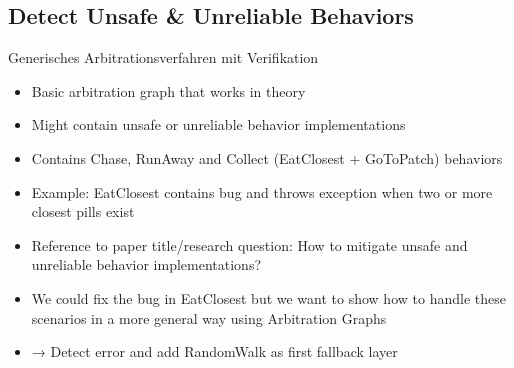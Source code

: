 \subsection{Detect Unsafe \& Unreliable Behaviors}
\begin{algorithm}

  \Fn{\BestOption{Situation $\situation$}}{\label{algo:verifying_arbitrator:bestOption}
    Filtere anwendbare Optionen $\applicableOptions \subset \options$\;
    Sortiere anwendbare Optionen %
      $\sortedApplicableOptions = \left< a_0, a_1, \dots \right> = \text{strategie}(\applicableOptions)$\;

    \For{$a \in \sortedApplicableOptions$}{
      Bestimme Stellgröße $\command_a = \getCommand_a(\situation)$\;

      Führe Verifikation $\verification_a = \verifier (\command_a)$ durch\;
      \If{Verifikation bestanden $\verification_a = 0$}{%
        \KwRet{$(\command_a, \verification_a)$}\;
      }
    }

    \KwRet{$(\emptyset, \text{NO\_SAFE\_OPTION})$}\;
    }
  \;
  \caption{Generisches Arbitrationsverfahren mit Verifikation\label{algo:verifying_arbitrator}}
\end{algorithm}
\begin{itemize}
    \item Basic arbitration graph that works in theory
    \item Might contain unsafe or unreliable behavior implementations
    \item Contains Chase, RunAway and Collect (EatClosest + GoToPatch) behaviors
    \item Example: EatClosest contains bug and throws exception when two or more closest pills exist
    \item Reference to paper title/research question: How to mitigate unsafe and unreliable behavior implementations?
    \item We could fix the bug in EatClosest but we want to show how to handle these scenarios in a more general way using Arbitration Graphs
    \item → Detect error and add RandomWalk as first fallback layer
\end{itemize}

